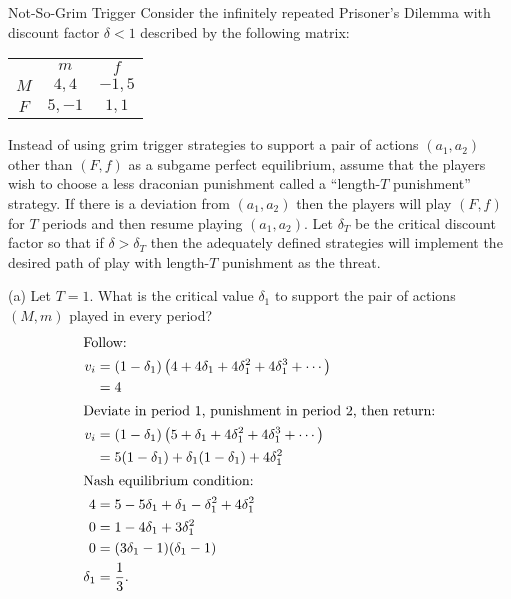 \documentclass[8pt]{extarticle}
\begin{document}
  \begin{problem}{Not-So-Grim Trigger}
    Consider the infinitely repeated Prisoner's Dilemma with discount factor $\delta < 1$ described by the following matrix:
    \begin{center}
      \begin{tabular}{c|c|c|}
        \multicolumn{1}{c}{} & \multicolumn{1}{c}{$m$} & \multicolumn{1}{c}{$f$}\\
        \cline{2-3}
        $M$ & $4,4$ & $-1,5$ \\
        \cline{2-3}
        $F$ & $5,-1$ & $1,1$\\
        \cline{2-3}
      \end{tabular}
    \end{center}
    Instead of using grim trigger strategies to support a pair of actions $(a_1,a_2)$ other than $(F,f)$ as a subgame perfect equilibrium, assume that the players wish to choose a less draconian punishment called a ``length-$T$ punishment'' strategy. If there is a deviation from $(a_1,a_2)$ then the players will play $(F,f)$ for $T$ periods and then resume playing $(a_1,a_2)$. Let $\delta_T$ be the critical discount factor so that if $\delta > \delta_T$ then the adequately defined strategies will implement the desired path of play with length-$T$ punishment as the threat.
    \tcblower
    \begin{problem}{(a)}
      Let $T = 1$. What is the critical value $\delta_1$ to support the pair of actions $(M,m)$ played in every period?
      \tcblower
      \begin{align*}
        \shortintertext{Follow:}
        v_i &= (1-\delta_1)\left(4 + 4\delta_1 + 4\delta_1^2 + 4\delta_1^3 + \cdots\right)\\
            &= 4\\
        \shortintertext{Deviate in period 1, punishment in period 2, then return:}
        v_i &= (1-\delta_1)\left(5 + \delta_1 + 4\delta_1^2 + 4\delta_1^3 + \cdots\right) \\
            &= 5(1-\delta_1) + \delta_1 (1-\delta_1) + 4\delta_1^2\\
        \shortintertext{Nash equilibrium condition:}
        4 &= 5-5\delta_1 + \delta_1 - \delta_1^2 + 4\delta_1^2\\
        0 &= 1 - 4\delta_1 + 3\delta_1^2\\
        0 &= (3\delta_1 - 1)(\delta_1 - 1)\\
        \delta_1 &= \frac{1}{3}.\\
      \end{align*}

\end{problem}
\end{problem}
\end{document}
